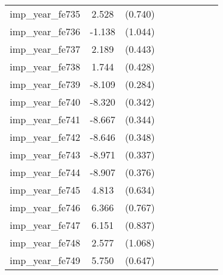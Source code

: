 {\begin{tabular}{l*{4}{cc}}
imp\_year\_fe735&    2.528\sym{***}&  (0.740)&                  &         &                  &         &                  &         \\
imp\_year\_fe736&   -1.138         &  (1.044)&                  &         &                  &         &                  &         \\
imp\_year\_fe737&    2.189\sym{***}&  (0.443)&                  &         &                  &         &                  &         \\
imp\_year\_fe738&    1.744\sym{***}&  (0.428)&                  &         &                  &         &                  &         \\
imp\_year\_fe739&   -8.109\sym{***}&  (0.284)&                  &         &                  &         &                  &         \\
imp\_year\_fe740&   -8.320\sym{***}&  (0.342)&                  &         &                  &         &                  &         \\
imp\_year\_fe741&   -8.667\sym{***}&  (0.344)&                  &         &                  &         &                  &         \\
imp\_year\_fe742&   -8.646\sym{***}&  (0.348)&                  &         &                  &         &                  &         \\
imp\_year\_fe743&   -8.971\sym{***}&  (0.337)&                  &         &                  &         &                  &         \\
imp\_year\_fe744&   -8.907\sym{***}&  (0.376)&                  &         &                  &         &                  &         \\
imp\_year\_fe745&    4.813\sym{***}&  (0.634)&                  &         &                  &         &                  &         \\
imp\_year\_fe746&    6.366\sym{***}&  (0.767)&                  &         &                  &         &                  &         \\
imp\_year\_fe747&    6.151\sym{***}&  (0.837)&                  &         &                  &         &                  &         \\
imp\_year\_fe748&    2.577\sym{*}  &  (1.068)&                  &         &                  &         &                  &         \\
imp\_year\_fe749&    5.750\sym{***}&  (0.647)&                  &         &                  &         &                  &         \\

\end{tabular}}
